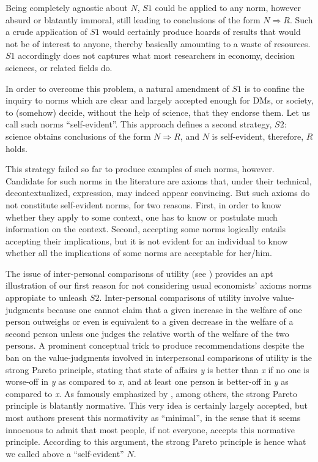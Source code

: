\documentclass[preprint, french, english, 11pt, authoryear]{elsarticle}%
\newcommand{\commentOCf}[1]{\textcolor{red}{\selectlanguage{french}{OC : #1}}}
\begin{document}
Being completely agnostic about $N$, $S1$ could be applied to any norm, however absurd or blatantly immoral, still leading to conclusions of the form $N ⇒ R$. Such a crude application of $S1$ would certainly produce hoards of results that would not be of interest to anyone, thereby basically amounting to a waste of resources. $S1$ accordingly does not captures what most researchers in economy, decision sciences, or related fields do.

In order to overcome this problem, a natural amendment of $S1$ is to confine the inquiry to norms which are clear and largely accepted enough for \acp{DM}, or society, to (somehow) decide, without the help of science, that they endorse them. Let us call such norms ``self-evident''.
This approach defines a second strategy, $S2$: science obtains conclusions of the form $N ⇒ R$, and $N$ is self-evident, therefore, $R$ holds.

This strategy failed so far to produce examples of such norms, however. Candidate for such norms in the literature are axioms that, under their technical, decontextualized, expression, may indeed appear convincing. But such axioms do not constitute self-evident norms, for two reasons. First, in order to know whether they apply to some context, one has to know or postulate much information on the context. Second, accepting some norms logically entails accepting their implications, but it is not evident for an individual to know whether all the implications of some norms are acceptable for her/him. \commentOCf{Décider si on adopte la stratégie de l’alternance.}

The issue of inter-personal comparisons of utility (see \cite{baujard_leconomie_2011}) provides an apt illustration of our first reason for not considering usual economists' axioms norms appropiate to unleash $S2$. Inter-personal comparisons of utility involve value-judgments because one cannot claim that a given increase in the welfare of one person outweighs or even is equivalent to a given decrease in the welfare of a second person unless one judges the relative worth of the welfare of the two persons. A prominent conceptual trick to produce recommendations despite the ban on the value-judgments involved in interpersonal comparisons of utility is the strong Pareto principle, stating that state of affairs \emph{y} is better than \emph{x} if no one is worse-off in \emph{y} as compared to \emph{x}, and at least one person is better-off in \emph{y} as compared to \emph{x}. As famously emphasized by \cite{sen_rationality_2004}, among others, the strong Pareto principle is blatantly normative. This very idea is certainly largely accepted, but most authors present this normativity as ``minimal'', in the sense that it seems innocuous to admit that most people, if not everyone, accepts this normative principle. According to this argument, the strong Pareto principle is hence what we called above a ``self-evident'' $N$.
\end{document}

